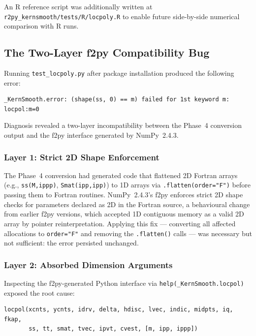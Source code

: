 \documentclass[12pt,a4paper]{article}
\begin{document}
An R reference script was additionally written at \texttt{r2py\_kernsmooth/tests/R/locpoly.R} to enable future side-by-side numerical comparison with R runs.

\subsection{The Two-Layer f2py Compatibility Bug}
\label{sec:phase6-f2py-bug}

Running \texttt{test\_locpoly.py} after package installation produced the following error:

\begin{lstlisting}[style=shell]
_KernSmooth.error: (shape(ss, 0) == m) failed for 1st keyword m: locpol:m=0
\end{lstlisting}

Diagnosis revealed a two-layer incompatibility between the Phase~4 conversion output and the f2py interface generated by NumPy~2.4.3.

\subsubsection{Layer 1: Strict 2D Shape Enforcement}

The Phase~4 conversion had generated code that flattened 2D Fortran arrays (e.g., \texttt{ss(M,ippp)}, \texttt{Smat(ipp,ipp)}) to 1D arrays via \texttt{.flatten(order="F")} before passing them to Fortran routines. NumPy~2.4.3's f2py enforces strict 2D shape checks for parameters declared as 2D in the Fortran source, a behavioural change from earlier f2py versions, which accepted 1D contiguous memory as a valid 2D array by pointer reinterpretation. Applying this fix --- converting all affected allocations to \texttt{order="F"} and removing the \texttt{.flatten()} calls --- was necessary but not sufficient: the error persisted unchanged.

\subsubsection{Layer 2: Absorbed Dimension Arguments}

Inspecting the f2py-generated Python interface via \texttt{help(\_KernSmooth.locpol)} exposed the root cause:

\begin{lstlisting}[style=shell]
locpol(xcnts, ycnts, idrv, delta, hdisc, lvec, indic, midpts, iq, fkap,
       ss, tt, smat, tvec, ipvt, cvest, [m, ipp, ippp])
\end{lstlisting}
\end{document}
